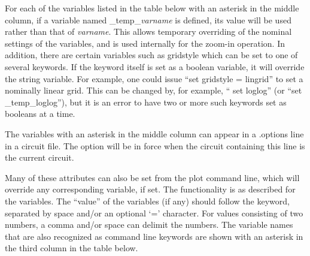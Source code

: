 For each of the variables listed in the table below with an asterisk
in the middle column, if a variable named {\et \_temp\_}{\it varname}
is defined, its value will be used rather than that of {\it varname}. 
This allows temporary overriding of the nominal settings of the
variables, and is used internally for the zoom-in operation.  In
addition, there are certain variables such as {\et gridstyle} which
can be set to one of several keywords.  If the keyword itself is set
as a boolean variable, it will override the string variable.  For
example, one could issue ``{\vt set gridstyle = lingrid}'' to set a
nominally linear grid.  This can be changed by, for example, ``{\vt
set loglog}'' (or ``{\vt set \_temp\_loglog}''), but it is an error to
have two or more such keywords set as booleans at a time.

The variables with an asterisk in the middle column can appear in a
{\vt .options} line in a circuit file.  The option will be in force
when the circuit containing this line is the current circuit.

Many of these attributes can also be set from the {\cb plot} command
line, which will override any corresponding variable, if set.  The
functionality is as described for the variables.  The ``value'' of the
variables (if any) should follow the keyword, separated by space
and/or an optional `{\vt =}' character.  For values consisting of two
numbers, a comma and/or space can delimit the numbers.  The variable
names that are also recognized as command line keywords are shown with
an asterisk in the third column in the table below.

